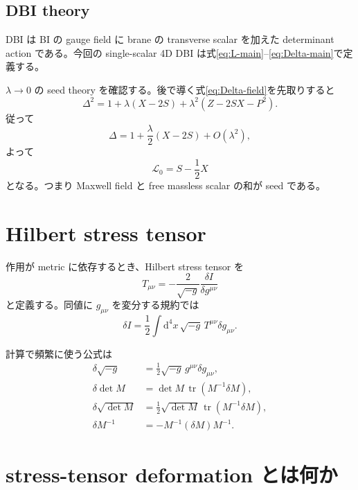 \documentclass[a4paper,11pt]{ltjsreport}
\newcommand{\tr}{\operatorname{tr}}
\newcommand{\dd}{\mathrm{d}}
\newcommand{\Lag}{\mathcal L}
\begin{document}
\subsection{DBI theory}

DBI は BI の gauge field に brane の transverse scalar を加えた determinant action である。今回の single-scalar 4D DBI は式\eqref{eq:L-main}--\eqref{eq:Delta-main}で定義する。

$\lambda\to0$ の seed theory を確認する。後で導く式\eqref{eq:Delta-field}を先取りすると
\begin{equation}
 \Delta^2
 =1+\lambda(X-2S)
 +\lambda^2\left(Z-2SX-P^2\right).
 \label{eq:Delta2-preview}
\end{equation}
従って
\begin{equation}
 \Delta
 =1+\frac{\lambda}{2}(X-2S)+O(\lambda^2),
\end{equation}
よって
\begin{equation}
 \Lag_{0}=S-\frac12X
 \label{eq:seed}
\end{equation}
となる。つまり Maxwell field と free massless scalar の和が seed である。

\section{Hilbert stress tensor}

作用が metric に依存するとき、Hilbert stress tensor を
\begin{equation}
 T_{\mu\nu}
 =-\frac{2}{\sqrt{-g}}\frac{\delta I}{\delta g^{\mu\nu}}
 \label{eq:HilbertT}
\end{equation}
と定義する。同値に $g_{\mu\nu}$ を変分する規約では
\begin{equation}
 \delta I
 =\frac12\int \dd^4x\,\sqrt{-g}\,T^{\mu\nu}\delta g_{\mu\nu}.
 \label{eq:variationT}
\end{equation}

計算で頻繁に使う公式は
\begin{align}
 \delta\sqrt{-g}
 &=\frac12\sqrt{-g}\,g^{\mu\nu}\delta g_{\mu\nu},
 \label{eq:var-sqrtg}\\
 \delta\det M
 &=\det M\,\tr(M^{-1}\delta M),
 \label{eq:var-det}\\
 \delta\sqrt{\det M}
 &=\frac12\sqrt{\det M}\,\tr(M^{-1}\delta M),
 \label{eq:var-sqrtdet}\\
 \delta M^{-1}&=-M^{-1}(\delta M)M^{-1}.
 \label{eq:var-inverse}
\end{align}

\section{stress-tensor deformation とは何か}
\end{document}

